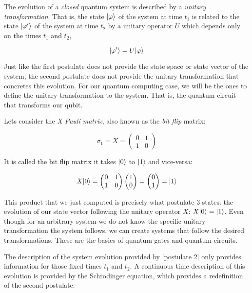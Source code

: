 \begin{postulate}
	The evolution of a \emph{closed} quantum system is described by a \emph{unitary transformation}. That is, the state $|\varphi\rangle$ of the system at time $t_1$ is related to the state $|\varphi'\rangle$ of the system at time $t_2$ by a unitary operator $U$ which depends only on the times $t_1$ and $t_2$,
	
	$$ |\varphi'\rangle = U|\varphi\rangle $$
\end{postulate}

Just like the first postulate does not provide the state space or state vector of the system, the second postulate does not provide the unitary transformation that concretes this evolution. For our quantum computing case, we will be the ones to define the unitary transformation  to the system. That is, the quantum circuit that transforms our qubit.

\begin{exampleth} Lets consider the \emph{X Pauli matrix}, also known as the \emph{bit flip} matrix:
	
	$$ \sigma_1 = X = 
	\begin{pmatrix}
		0 & 1 \\
		1 & 0 
	\end{pmatrix}
	$$
	
	It is called the bit flip matrix it takes $|0\rangle$ to $|1\rangle$ and vice-versa:
	
	$$  X|0\rangle = 
	\begin{pmatrix}
		0 & 1 \\
		1 & 0 
	\end{pmatrix}
	\begin{pmatrix}
		1 \\
		0 
	\end{pmatrix}=
	\begin{pmatrix}
		0 \\
		1 
	\end{pmatrix} =
	|1\rangle
	$$
	
	This product that we just computed is precisely what postulate 3 states: the evolution of our state vector following the unitary operator $X$: $X|0\rangle = |1\rangle$. Even though for an arbitrary system we do not know the specific unitary transformation the system follows, we can create systems that follow the desired transformations. These are the basics of quantum gates and quantum circuits. 
\end{exampleth}

The description of the system evolution provided by \ref{postulate 2} only provides information for those fixed times $t_1$ and $t_2$. A continuous time description of this evolution is provided by the Schrodinger equation, which provides a redefinition of the second postulate.


